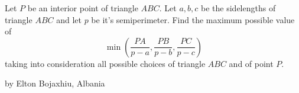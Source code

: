 Let $P$ be an interior point of triangle $ABC$. Let $a,b,c$ be the sidelengths of triangle $ABC$ and let $p$ be it's semiperimeter. Find the maximum possible value of$$ \min\left(\frac{PA}{p-a},\frac{PB}{p-b},\frac{PC}{p-c}\right)$$taking into consideration all possible choices of triangle $ABC$ and of point $P$.

by Elton Bojaxhiu, Albania